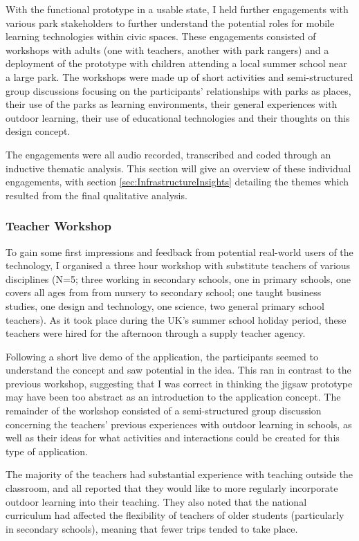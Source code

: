 With the functional prototype in a usable state, I held further engagements with various park stakeholders to further understand the potential roles for mobile learning technologies within civic spaces. These engagements consisted of workshops with adults (one with teachers, another with park rangers) and a deployment of the prototype with children attending a local summer school near a large park. The workshops were made up of short activities and semi-structured group discussions focusing on the participants’ relationships with parks as places, their use of the parks as learning environments, their general experiences with outdoor learning, their use of educational technologies and their thoughts on this design concept.

The engagements were all audio recorded, transcribed and coded through an inductive thematic analysis. This section will give an overview of these individual engagements, with section \ref{sec:InfrastructureInsights} detailing the themes which resulted from the final qualitative analysis.  

\subsubsection{Teacher Workshop}

To gain some first impressions and feedback from potential real-world users of the technology, I organised a three hour workshop with substitute teachers of various disciplines (N=5; three working in secondary schools, one in primary schools, one covers all ages from from nursery to secondary school; one taught business studies, one design and technology, one science, two general primary school teachers). As it took place during the UK's summer school holiday period, these teachers were hired for the afternoon through a supply teacher agency. 

Following a short live demo of the application, the participants seemed to understand the concept and saw potential in the idea. This ran in contrast to the previous workshop, suggesting that I was correct in thinking the jigsaw prototype may have been too abstract as an introduction to the application concept. The remainder of the workshop consisted of a semi-structured group discussion concerning the teachers' previous experiences with outdoor learning in schools, as well as their ideas for what activities and interactions could be created for this type of application.

The majority of the teachers had substantial experience with teaching outside the classroom, and all reported that they would like to more regularly incorporate outdoor learning into their teaching. They also noted that the national curriculum had affected the flexibility of teachers of older students (particularly in secondary schools), meaning that fewer trips tended to take place. 

